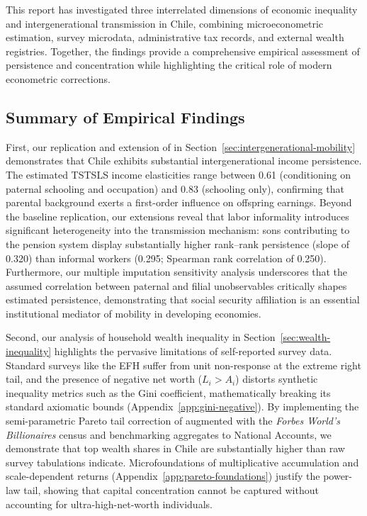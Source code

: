 This report has investigated three interrelated dimensions of economic inequality and intergenerational transmission in Chile, combining microeconometric estimation, survey microdata, administrative tax records, and external wealth registries. Together, the findings provide a comprehensive empirical assessment of persistence and concentration while highlighting the critical role of modern econometric corrections.

\subsection*{Summary of Empirical Findings}

First, our replication and extension of \citet{nunez2010mobility} in Section~\ref{sec:intergenerational-mobility} demonstrates that Chile exhibits substantial intergenerational income persistence. The estimated TSTSLS income elasticities range between 0.61 (conditioning on paternal schooling and occupation) and 0.83 (schooling only), confirming that parental background exerts a first-order influence on offspring earnings. Beyond the baseline replication, our extensions reveal that labor informality introduces significant heterogeneity into the transmission mechanism: sons contributing to the pension system display substantially higher rank--rank persistence (slope of 0.320) than informal workers (0.295; Spearman rank correlation of 0.250). Furthermore, our multiple imputation sensitivity analysis underscores that the assumed correlation between paternal and filial unobservables critically shapes estimated persistence, demonstrating that social security affiliation is an essential institutional mediator of mobility in developing economies.

Second, our analysis of household wealth inequality in Section~\ref{sec:wealth-inequality} highlights the pervasive limitations of self-reported survey data. Standard surveys like the EFH suffer from unit non-response at the extreme right tail, and the presence of negative net worth ($L_i > A_i$) distorts synthetic inequality metrics such as the Gini coefficient, mathematically breaking its standard axiomatic bounds (Appendix~\ref{app:gini-negative}). By implementing the semi-parametric Pareto tail correction of \citet{vermeulen2018} augmented with the \textit{Forbes World's Billionaires} census and benchmarking aggregates to National Accounts, we demonstrate that top wealth shares in Chile are substantially higher than raw survey tabulations indicate. Microfoundations of multiplicative accumulation and scale-dependent returns (Appendix~\ref{app:pareto-foundations}) justify the power-law tail, showing that capital concentration cannot be captured without accounting for ultra-high-net-worth individuals.

